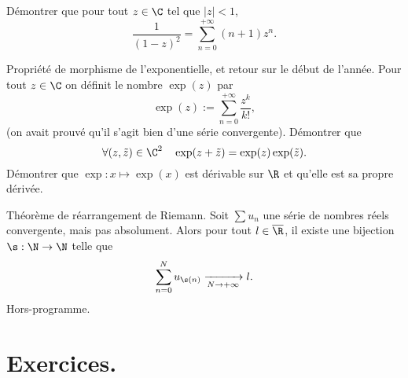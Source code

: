 \documentclass[11pt]{article}
\begin{document}
\begin{ex}{}{}
    Démontrer que pour tout $z\in\C$ tel que $|z|<1$,
    \begin{equation*}
        \frac{1}{(1-z)^2}=\sum_{n=0}^{+\infty}(n+1)z^n.
    \end{equation*}
\end{ex}

\begin{ex}{Propriété de morphisme de l'exponentielle, et retour sur le début de l'année.}{}
    Pour tout $z\in\C$ on définit le nombre $\exp(z)$ par
    \begin{equation*}
        \exp(z):=\sum_{n=0}^{+\infty}\frac{z^k}{k!},
    \end{equation*}
    (on avait prouvé qu'il s'agit bien d'une série convergente).\n
    Démontrer que
    \begin{equation*}
        \forall (z,\tilde{z})\in\C^2\quad\exp(z+\tilde{z})=\exp(z)\exp(\tilde{z}).
    \end{equation*}
    Démontrer que $\exp:x\mapsto\exp(x)$ est dérivable sur $\R$ et qu'elle est sa propre dérivée.
\end{ex}

\begin{thm}{Théorème de réarrangement de Riemann.}{}
    Soit $\sum u_n$ une série de nombres réels convergente, mais pas absolument. Alors pour tout $l\in\overline{\R}$, il existe une bijection $\s:\N\to\N$ telle que \begin{equation*}\sum_{n=0}^Nu_{\s(n)}\xrightarrow[N\to+\infty]{}l.\end{equation*}
    \tcblower
    Hors-programme.
\end{thm}

\pagebreak

\section{Exercices.}
\end{document}
